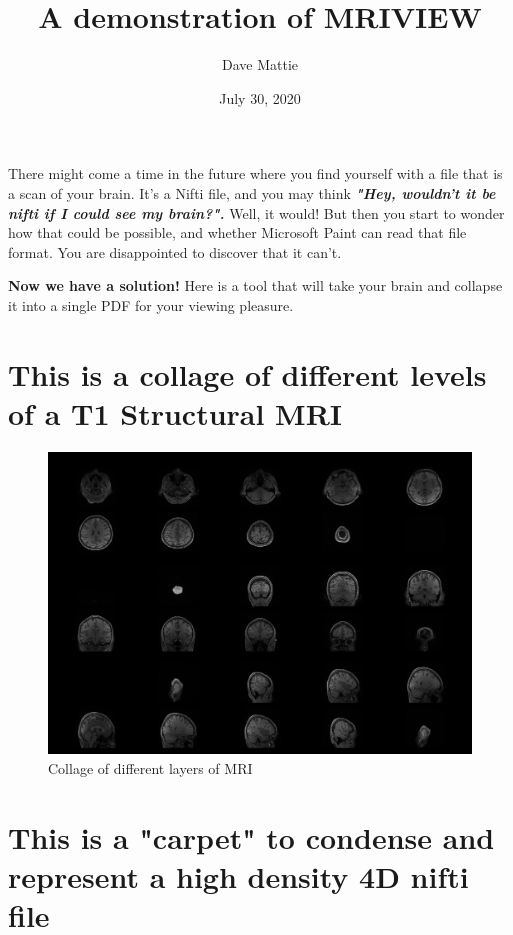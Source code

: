 \documentclass[]{report}
\begin{document}
\title{A demonstration of MRIVIEW}
\author{Dave Mattie}
\date{July 30, 2020}
\maketitle

There might come a time in the future where you find yourself with a file 
that is a scan of your brain.  It's a Nifti file, and you may think 
\textit{\textbf{"Hey, wouldn't it be nifti if I could see my brain?".}}  Well, it would!  But then 
you start to wonder how that 
could be possible, and whether Microsoft Paint can read that file format.  You are disappointed to
discover that it can't.  

\textbf{Now we have a solution!}  Here is a tool that will take 
your brain and collapse it into a single PDF for your viewing pleasure.

\section{This is a collage of different levels of a T1 Structural MRI}

\begin{figure}[h!]
\centering
\includegraphics[scale=0.22]{collage.png}
\caption{Collage of different layers of MRI}
\label{fig:collage}
\end{figure}

\section{This is a "carpet" to condense and represent a high density 4D nifti file}
\end{document}
